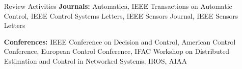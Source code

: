 \begin{rSection}{Review Activities}
{\bf Journals:} Automatica, IEEE Transactions on Automatic Control, IEEE Control Systems Letters, IEEE Sensors Journal, IEEE Sensors Letters

{\bf Conferences:} IEEE Conference on Decision and Control, American Control Conference, European Control Conference, IFAC Workshop on Distributed Estimation and Control in Networked Systems, IROS, AIAA
\end{rSection}